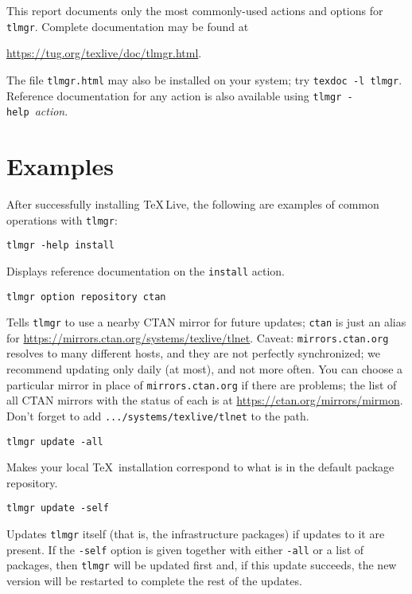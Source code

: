 \documentclass[11pt]{article}
\begin{document}
This report documents only the most commonly-used actions
and options for \texttt{tlmgr}. Complete documentation may
be found at
\begin{center}
  \url{https://tug.org/texlive/doc/tlmgr.html}. 
\end{center}
The file \texttt{tlmgr.html} may also be installed on your system; try \texttt{texdoc -l tlmgr}.
Reference documentation for any action is also available using 
\texttt{tlmgr  -help}~\textit{action}.

\section{Examples}

After successfully installing \TeX\,Live, the following are
examples of common operations with \texttt{tlmgr}:
\begin{description}

\item\texttt{tlmgr -help install}\par

Displays reference documentation on the \texttt{install} action.

\item\texttt{tlmgr option repository ctan}\par 

Tells \texttt{tlmgr} to use a nearby CTAN mirror for
future updates; \texttt{ctan} is just an alias for
\url{https://mirrors.ctan.org/systems/texlive/tlnet}. Caveat:
\texttt{mirrors.ctan.org} resolves to many different
hosts, and they are not perfectly synchronized; we
recommend updating only daily (at most), and not more
often. You can choose a particular mirror in place of
\texttt{mirrors.ctan.org} if there are problems; the
list of all CTAN mirrors with the status of each is at
\url{https://ctan.org/mirrors/mirmon}. Don't forget to add
\texttt{.../systems/texlive/tlnet} to the path.

\item\texttt{tlmgr update -all}\par 

Makes your local \TeX\ installation correspond to what is in
the default package repository.

\item\texttt{tlmgr update -self}\par 

Updates \texttt{tlmgr} itself (that is, the infrastructure
packages) if updates to it are present. If the
\texttt{-self} option is given together with either
\texttt{-all} or a list of packages, then \texttt{tlmgr}
will be updated first and, if this update succeeds, the
new version will be restarted to complete the rest of the
updates.


\end{description}
\end{document}
